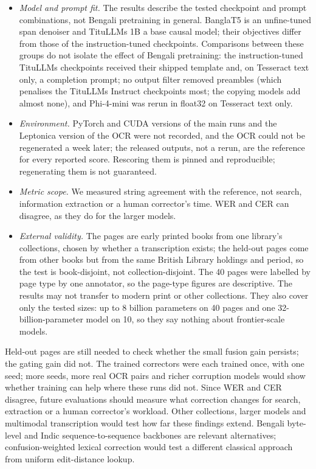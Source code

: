 \documentclass[conference]{IEEEtran}
\begin{document}
\begin{itemize}
\item \emph{Model and prompt fit.} The results describe the tested checkpoint and prompt combinations, not Bengali pretraining in general. BanglaT5 is an unfine-tuned span denoiser and TituLLMs 1B a base causal model; their objectives differ from those of the instruction-tuned checkpoints. Comparisons between these groups do not isolate the effect of Bengali pretraining: the instruction-tuned TituLLMs checkpoints received their shipped template and, on Tesseract text only, a completion prompt; no output filter removed preambles (which penalises the TituLLMs Instruct checkpoints most; the copying models add almost none), and Phi-4-mini was rerun in float32 on Tesseract text only.
\item \emph{Environment.} PyTorch and CUDA versions of the main runs and the Leptonica version of the OCR were not recorded, and the OCR could not be regenerated a week later; the released outputs, not a rerun, are the reference for every reported score. Rescoring them is pinned and reproducible; regenerating them is not guaranteed.
\item \emph{Metric scope.} We measured string agreement with the reference, not search, information extraction or a human corrector's time. WER and CER can disagree, as they do for the larger models.
\item \emph{External validity.} The pages are early printed books from one library's collections, chosen by whether a transcription exists; the held-out pages come from other books but from the same British Library holdings and period, so the test is book-disjoint, not collection-disjoint. The 40 pages were labelled by page type by one annotator, so the page-type figures are descriptive. The results may not transfer to modern print or other collections. They also cover only the tested sizes: up to 8 billion parameters on 40 pages and one 32-billion-parameter model on 10, so they say nothing about frontier-scale models.
\end{itemize}
Held-out pages are still needed to check whether the small fusion gain persists; the gating gain did not. The trained correctors were each trained once, with one seed; more seeds, more real OCR pairs and richer corruption models would show whether training can help where these runs did not. Since WER and CER disagree, future evaluations should measure what correction changes for search, extraction or a human corrector's workload. Other collections, larger models and multimodal transcription would test how far these findings extend. Bengali byte-level and Indic sequence-to-sequence backbones are relevant alternatives; confusion-weighted lexical correction would test a different classical approach from uniform edit-distance lookup.
\end{document}
